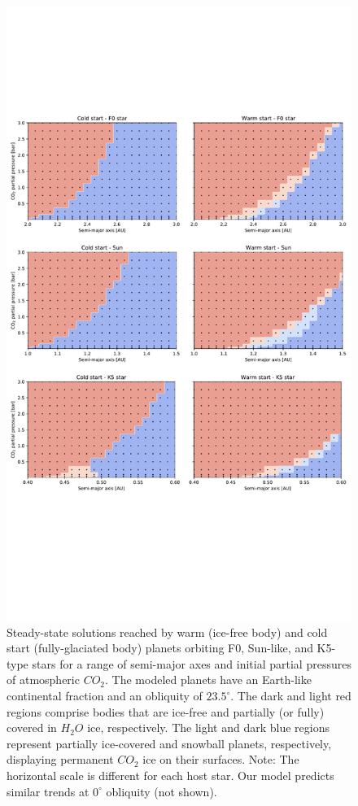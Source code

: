 \documentclass[fleqn,usenatbib]{mnras}
\begin{document}
\begin{figure}
	\includegraphics[width=\textwidth]{Figures/Steady_state_all.pdf}
    \caption{Steady-state solutions reached by warm (ice-free body) and cold start (fully-glaciated body) planets orbiting F0, Sun-like, and K5-type stars for a range of semi-major axes and initial partial pressures of atmospheric $CO_{\mathrm{2}}$. The modeled planets have an Earth-like continental fraction and an obliquity of $23.5^{\circ}$. The dark and light red regions comprise bodies that are ice-free and partially (or fully) covered in $H_{\mathrm{2}}O$ ice, respectively. The light and dark blue regions represent partially ice-covered and snowball planets, respectively, displaying permanent $CO_{\mathrm{2}}$ ice on their surfaces. Note: The horizontal scale is different for each host star. Our model predicts similar trends at $0^{\circ}$ obliquity (not shown).} 
    \label{fig:ss_all}
\end{figure}
\end{document}
